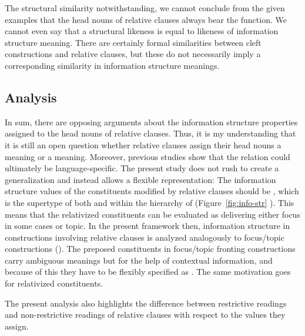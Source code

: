 The structural similarity notwithstanding, we
cannot conclude from the given examples that the head nouns of
relative clauses always bear the  function. We cannot even say
that a structural likeness is equal to likeness of information
structure meaning. There are certainly formal
similarities between cleft constructions and relative clauses, but
these do not necessarily imply a corresponding similarity in
information structure meanings.



\subsection{Analysis}
\label{10:ssec:relative:analysis}

In sum, there are opposing arguments about the information structure
properties assigned to the head nouns of relative clauses. Thus, it is
my understanding that it is still an open question whether relative
clauses assign their head nouns a  meaning or a 
meaning. Moreover, previous studies show that the relation could
ultimately be language-specific. The present study
does not rush to create a generalization and instead allows a flexible
representation: The information structure values of the constituents
modified by relative clauses should be , which is
the supertype of both  and  within the hierarchy
of 
(Figure~\ref{fig:info-str} ). This means that the
relativized constituents can be evaluated as delivering either focus
in some cases or topic. In the present framework then, information
structure in constructions involving relative clauses is analyzed
analogously to focus/topic  constructions
(). The preposed constituents in focus/topic
fronting constructions carry ambiguous meanings but for the help of
contextual information, and because of this they have to be flexibly
specified as . The same motivation goes for
relativized constituents.



The present analysis also highlights the difference between
restrictive readings and non-restrictive readings of relative clauses
with respect to the  values they assign.


